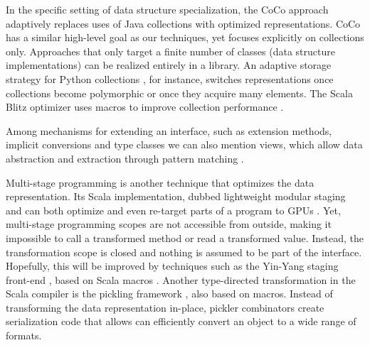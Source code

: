 In the specific setting of data structure specialization, the CoCo
approach~\cite{Xu:2013:CSA:2524984.2524986} adaptively replaces uses
of Java collections with optimized representations.  CoCo has a
similar high-level goal as our techniques, yet focuses explicitly on
collections only. Approaches that only target a finite number of
classes (data structure implementations) can be realized entirely in a
library. An adaptive storage strategy for Python collections
\cite{Bolz:2013:SSC:2509136.2509531}, for instance, switches
representations once collections become polymorphic or once they
acquire many elements. The Scala Blitz optimizer uses macros to
improve collection performance \cite{scalablitz-paper, scalablitz}.

Among mechanisms for extending an interface, such as extension methods,
implicit conversions \cite{oliveira-implicit-calculus} and
type classes \cite{wadler-typeclasses} we can also mention
views, which allow data abstraction and extraction through pattern matching \cite{wadler-views}.

Multi-stage programming \cite{taha-intro} is another technique that
optimizes the data representation. Its Scala implementation, dubbed
lightweight modular staging and can both optimize and even re-target parts of a
program to GPUs \cite{tiark-lms,delite}. Yet, multi-stage programming
scopes are not accessible from outside, making it impossible to call
a transformed method or read a transformed value. Instead, the transformation
scope is closed and nothing is assumed to be part of the interface.
Hopefully, this will be improved by techniques such as the Yin-Yang
staging front-end \cite{vojin-yy}, based on Scala macros \cite{eugene-macros}.
Another type-directed transformation in the Scala compiler is the
pickling framework \cite{heather-pickers}, also based on macros.
Instead of transforming the data representation in-place, pickler combinators
create serialization code that allows can efficiently convert an object to a wide
range of formats.